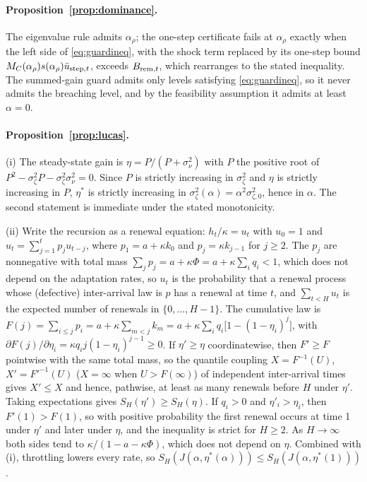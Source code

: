 \documentclass[12pt]{article}
\theoremstyle{definition}
\theoremstyle{remark}
\begin{document}
\paragraph{Proposition~\ref{prop:dominance}.} The eigenvalue rule admits $\alpha_\rho$; the one-step certificate fails at $\alpha_\rho$ exactly when the left side of \eqref{eq:guardineq}, with the shock term replaced by its one-step bound $M_C(\alpha_\rho)s(\alpha_\rho)\bar u_{{\rm step},t}$, exceeds $B_{{\rm rem},t}$, which rearranges to the stated inequality. The summed-gain guard admits only levels satisfying \eqref{eq:guardineq}, so it never admits the breaching level, and by the feasibility assumption it admits at least $\alpha=0$.

\paragraph{Proposition~\ref{prop:lucas}.} (i) The steady-state gain is $\eta=P/(P+\sigma_\nu^2)$ with $P$ the positive root of $P^2-\sigma_\zeta^2P-\sigma_\zeta^2\sigma_\nu^2=0$. Since $P$ is strictly increasing in $\sigma_\zeta^2$ and $\eta$ is strictly increasing in $P$, $\eta^*$ is strictly increasing in $\sigma_\zeta^2(\alpha)=\alpha^2\sigma_{\zeta,0}^2$, hence in $\alpha$. The second statement is immediate under the stated monotonicity.

(ii) Write the recursion as a renewal equation: $h_t/\kappa=u_t$ with $u_0=1$ and $u_t=\sum_{j=1}^tp_ju_{t-j}$, where $p_1=a+\kappa k_0$ and $p_j=\kappa k_{j-1}$ for $j\ge2$. The $p_j$ are nonnegative with total mass $\sum_jp_j=a+\kappa\Phi=a+\kappa\sum_iq_i<1$, which does not depend on the adaptation rates, so $u_t$ is the probability that a renewal process whose (defective) inter-arrival law is $p$ has a renewal at time $t$, and $\sum_{t<H}u_t$ is the expected number of renewals in $\{0,\ldots,H-1\}$. The cumulative law is $F(j)=\sum_{i\le j}p_i=a+\kappa\sum_{m<j}k_m=a+\kappa\sum_iq_i\bigl[1-(1-\eta_i)^j\bigr]$, with $\partial F(j)/\partial\eta_i=\kappa q_ij(1-\eta_i)^{j-1}\ge0$. If $\eta'\ge\eta$ coordinatewise, then $F'\ge F$ pointwise with the same total mass, so the quantile coupling $X=F^{-1}(U)$, $X'=F'^{-1}(U)$ ($X=\infty$ when $U>F(\infty)$) of independent inter-arrival times gives $X'\le X$ and hence, pathwise, at least as many renewals before $H$ under $\eta'$. Taking expectations gives $S_H(\eta')\ge S_H(\eta)$. If $q_i>0$ and $\eta'_i>\eta_i$, then $F'(1)>F(1)$, so with positive probability the first renewal occurs at time 1 under $\eta'$ and later under $\eta$, and the inequality is strict for $H\ge2$. As $H\to\infty$ both sides tend to $\kappa/(1-a-\kappa\Phi)$, which does not depend on $\eta$. Combined with (i), throttling lowers every rate, so $S_H(J(\alpha,\eta^*(\alpha)))\le S_H(J(\alpha,\eta^*(1)))$.
\end{document}
